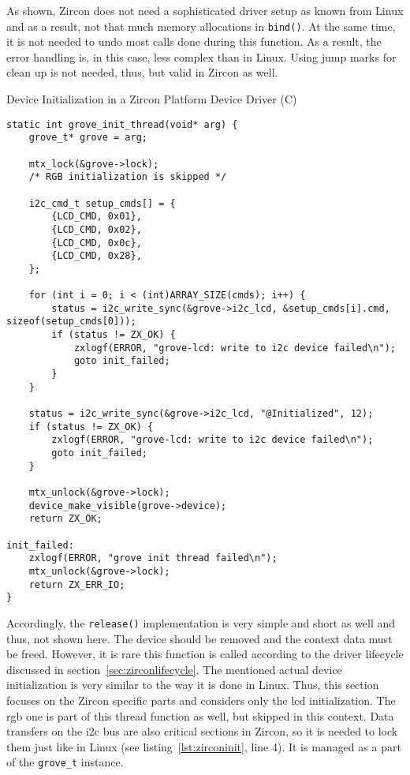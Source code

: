 As shown, Zircon does not need a sophisticated driver setup as known from Linux and as a result, not that much memory allocations in \texttt{bind()}.
At the same time, it is not needed to undo most calls done during this function.
As a result, the error handling is, in this case, less complex than in Linux.
Using jump marks for clean up is not needed, thus, but valid in Zircon as well.
%
\begin{listing} [H]
    \caption{Device Initialization in a Zircon Platform Device Driver (C)}
\label{lst:zirconinit}
\begin{verbatim}
static int grove_init_thread(void* arg) {
    grove_t* grove = arg;

    mtx_lock(&grove->lock);
    /* RGB initialization is skipped */

    i2c_cmd_t setup_cmds[] = {
        {LCD_CMD, 0x01},
        {LCD_CMD, 0x02},
        {LCD_CMD, 0x0c},
        {LCD_CMD, 0x28},
    };

    for (int i = 0; i < (int)ARRAY_SIZE(cmds); i++) {
        status = i2c_write_sync(&grove->i2c_lcd, &setup_cmds[i].cmd, sizeof(setup_cmds[0]));
        if (status != ZX_OK) {
            zxlogf(ERROR, "grove-lcd: write to i2c device failed\n");
            goto init_failed;
        }
    }

    status = i2c_write_sync(&grove->i2c_lcd, "@Initialized", 12);
    if (status != ZX_OK) {
        zxlogf(ERROR, "grove-lcd: write to i2c device failed\n");
        goto init_failed;
    }

    mtx_unlock(&grove->lock);
    device_make_visible(grove->device);
    return ZX_OK;

init_failed:
    zxlogf(ERROR, "grove init thread failed\n");
    mtx_unlock(&grove->lock);
    return ZX_ERR_IO;
}
\end{verbatim}
\end{listing}
%
Accordingly, the \texttt{release()} implementation is very simple and short as well and thus, not shown here.
The device should be removed and the context data must be freed.
However, it is rare this function is called according to the driver lifecycle discussed in section~\ref{sec:zirconlifecycle}.
The mentioned actual device initialization is very similar to the way it is done in Linux.
Thus, this section focuses on the Zircon specific parts and considers only the \ac{lcd} initialization.
The \ac{rgb} one is part of this thread function as well, but skipped in this context.
Data transfers on the \ac{i2c} bus are also critical sections in Zircon, so it is needed to lock them just like in Linux (see listing~\ref{lst:zirconinit}, line 4).
It is managed as a part of the \texttt{grove_t} instance.

